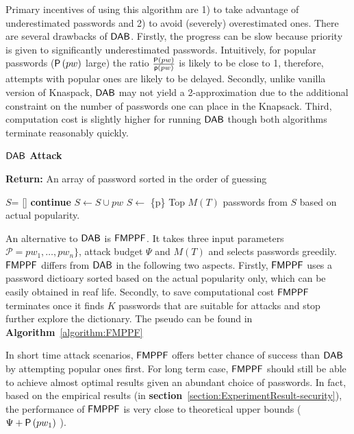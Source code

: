 Primary incentives of using this algorithm are 1) to take advantage of underestimated passwords and 2) to avoid (severely) overestimated ones. There are several drawbacks of $\mathsf{DAB}$. Firstly, the progress can be slow because priority is given to significantly underestimated passwords. Intuitively, for popular passwords ($\mathsf{P}\left(pw\right)$ large) the ratio $\frac{\mathsf{P}\left(pw\right)}{\textsf{p}(pw)}$ is likely to be close to 1, therefore, attempts with popular ones are likely to be delayed. Secondly, unlike vanilla version of Knaspack, $\mathsf{DAB}$ may not yield a 2-approximation due to the additional constraint on the number of passwords one can place in the Knapsack. Third, computation cost is slightly higher for running $\mathsf{DAB}$ though both algorithms terminate reasonably quickly. %



\begin{algorithm}[!htb]
	\caption{\textbf{$\mathsf{DAB}$ Attack }}\label{algorithm:Dantizig}
	\textbf{Return:}  An array of password sorted in the order of guessing
	\begin{algorithmic}[1]
		\State $S$= []
		\State \textbf{continue}
		\EndIf
		\State $S \leftarrow S \cup pw$ 
		\State $S \leftarrow$ \{p\}
		\EndIf
		\EndFor
		\EndWhile
		\State \Return Top $M(T)$ passwords from $S$ based on actual popularity.
		\EndFunction
	\end{algorithmic}
\end{algorithm}  





An alternative to $\mathsf{DAB}$ is $\mathsf{FMPPF}$. It takes three input parameters $\mathcal{P} = pw_1, \ldots, pw_{n} \}$, attack budget $\Psi$ and $M(T)$ and selects passwords greedily. $\mathsf{FMPPF}$ differs from $\mathsf{DAB}$ in the following two aspects. Firstly, $\mathsf{FMPPF}$ uses a password dictioary sorted based on the actual popularity only, which can be easily obtained in reaf life. Secondly, to save computational cost $\mathsf{FMPPF}$  terminates once it finds $K$ passwords that are suitable for attacks and stop further explore the dictionary. The pseudo can be found in \textbf{Algorithm}~\ref{algorithm:FMPPF}

In short time attack scenarios, $\mathsf{FMPPF}$ offers better chance of success than $\mathsf{DAB}$ by attempting popular ones first. For long term case, $\mathsf{FMPPF}$ should still be able to achieve almost optimal results given an abundant choice of passwords.  In fact, based on the empirical results (in \textbf{section}~\ref{section:ExperimentResult-security}), the performance of $\mathsf{FMPPF}$ is very close to theoretical upper bounds ($\Psi + \mathsf{P}\left(pw_1\right)$ ). %


